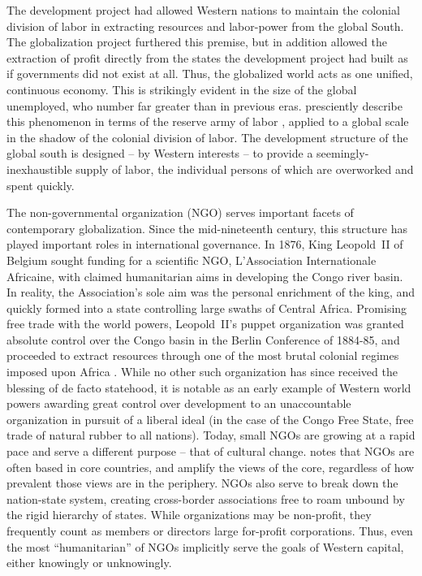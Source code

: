 \documentclass{../../../coursework}
\begin{document}
The development project had allowed Western nations to maintain the colonial
division of labor in extracting resources and labor-power from the global
South. The globalization project furthered this premise, but in addition
allowed the extraction of profit directly from the states the development
project had built as if governments did not exist at all. Thus, the globalized
world acts as one unified, continuous economy. This is strikingly evident in
the size of the global unemployed, who number far greater than in previous
eras. \textcite{Frobel1976} presciently describe this phenomenon in terms of
the reserve army of labor \parencite[see][ch.\ 25.2]{Marx1887}, applied to a
global scale in the shadow of the colonial division of labor. The development
structure of the global south is designed -- by Western interests -- to
provide a seemingly-inexhaustible supply of labor, the individual persons of
which are overworked and spent quickly.

The non-governmental organization (NGO) serves important facets of
contemporary globalization. Since the mid-nineteenth century, this structure
has played important roles in international governance. In 1876, King
Leopold~II of Belgium sought funding for a scientific NGO, L'Association
Internationale Africaine, with claimed humanitarian aims in developing the
Congo river basin. In reality, the Association's sole aim was the personal
enrichment of the king, and quickly formed into a state controlling large
swaths of Central Africa. Promising free trade with the world powers,
Leopold~II's puppet organization was granted absolute control over the Congo
basin in the Berlin Conference of 1884-85, and proceeded to extract resources
through one of the most brutal colonial regimes imposed upon Africa
\parencites{Sayre1919}[see also][]{Charnovitz1997}. While no other such
organization has since received the blessing of de facto statehood, it is
notable as an early example of Western world powers awarding great control
over development to an unaccountable organization in pursuit of a liberal
ideal (in the case of the Congo Free State, free trade of natural rubber to
all nations). Today, small NGOs are growing at a rapid pace and serve a
different purpose -- that of cultural change. \textcite{Charnovitz1997} notes
that NGOs are often based in core countries, and amplify the views of the
core, regardless of how prevalent those views are in the periphery.
NGOs also serve to break down the nation-state system, creating cross-border
associations free to roam unbound by the rigid hierarchy of states.
While organizations may be non-profit, they frequently count as members or
directors large for-profit corporations. Thus, even the most ``humanitarian''
of NGOs implicitly serve the goals of Western capital, either knowingly or
unknowingly.
\end{document}
